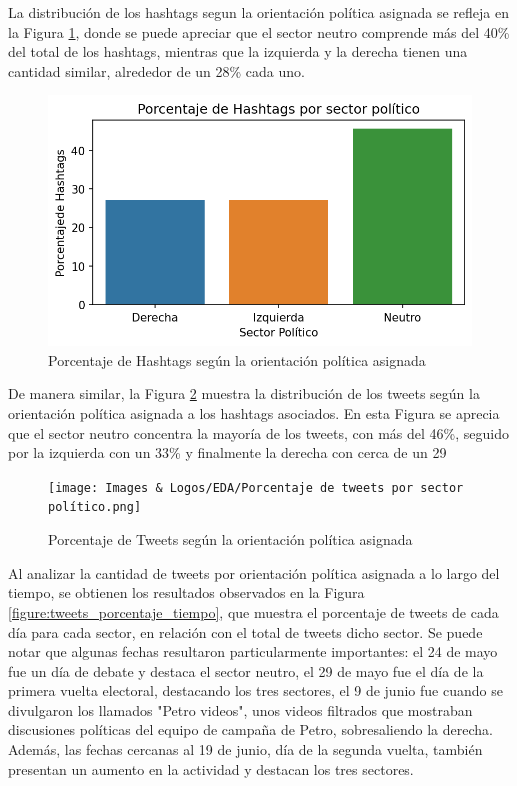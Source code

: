 
\normalsize


 

La distribución de los hashtags segun la orientación política asignada se refleja en la Figura \ref{figure:tweets_cantidad_hashtags}, donde se puede apreciar que el sector neutro comprende más del 40\% del total de los hashtags, mientras que la izquierda y la derecha tienen una cantidad similar, alrededor de un 28\% cada uno.

\begin{figure}[t]
	\centering
	\includegraphics{Images & Logos/EDA/Cantidad de Hashtags por sector politico.png}
	\caption{Porcentaje de Hashtags según la orientación política asignada}
	\label{figure:tweets_cantidad_hashtags}
\end{figure}

De manera similar, la Figura \ref{figure:tweets_porcentaje} muestra la distribución de los tweets según la orientación política asignada a los hashtags asociados. En esta Figura se aprecia que el sector neutro concentra la mayoría de los tweets, con más del 46\%, seguido por la izquierda con un 33\% y finalmente la derecha con cerca de un 29%

\begin{figure}[!htbp]
	\centering
	\texttt{[image: Images \& Logos/EDA/Porcentaje de tweets por sector político.png]}
	\caption{Porcentaje de Tweets según la orientación política asignada}
	\label{figure:tweets_porcentaje}
\end{figure}

Al analizar la cantidad de tweets por orientación política asignada a lo largo del tiempo, se obtienen los resultados observados en la Figura \ref{figure:tweets_porcentaje_tiempo}, que muestra el porcentaje de tweets de cada día para cada sector, en relación con el total de tweets dicho sector. Se puede notar que algunas fechas resultaron particularmente importantes: el 24 de mayo fue un día de debate y destaca el sector neutro, el 29 de mayo fue el día de la primera vuelta electoral, destacando los tres sectores, el 9 de junio fue cuando se divulgaron los llamados "Petro videos", unos videos filtrados que mostraban discusiones políticas del equipo de campaña de Petro, sobresaliendo la derecha. Además, las fechas cercanas al 19 de junio, día de la segunda vuelta, también presentan un aumento en la actividad y destacan los tres sectores.




